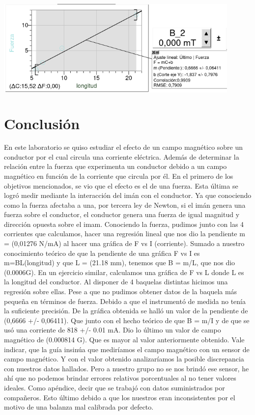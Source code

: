 \documentclass[12pt]{exam}
\newenvironment{Figura}
  {\par\medskip\noindent\minipage{\linewidth}}
  {\endminipage\par\medskip}
\begin{document}
\begin{multicols}{2}
\begin{Figura}
    \label{fig}
\end{Figura}
\begin{Figura}
    \centering
    \includegraphics[width=0.9\textwidth]{Img/Figura4_Lab12.png}
    \label{fig}
\end{Figura}
\section{Conclusión}
En este laboratorio se quiso estudiar el efecto de un campo magnético sobre un conductor por el cual circula una corriente eléctrica. Además de determinar la relación entre la fuerza que experimenta un conductor debido a un campo magnético en función de la corriente que circula por él. En el primero de los objetivos mencionados, se vio que el efecto es el de una fuerza. Esta última se logró medir mediante la interacción del imán con el conductor. Ya que conociendo como la fuerza afectaba a una, por tercera ley de Newton, si el imán genera una fuerza sobre el conductor, el conductor genera una fuerza de igual magnitud y dirección opuesta sobre el imam. Conociendo la fuerza, pudimos junto con las 4 corrientes que calculamos, hacer una regresión lineal que nos dio la pendiente m = (0,01276 N/mA) al hacer una gráfica de F vs I (corriente). Sumado a nuestro conocimiento teórico de que la pendiente de una gráfica F vs I es m=BL(longitud) y que L = (21.18 mm), tenemos que B = m/L, 	que nos dio (0.0006G).
En un ejercicio similar, calculamos una gráfica de F vs L donde L es la longitud del conductor. Al disponer de 4 baquelas distintas hicimos una regresión sobre ellas. Pese a que no pudimos obtener datos de la baquela más pequeña en términos de fuerza. Debido a que el instrumentó de medida no tenía la suficiente precisión. De la gráfica obtenida se halló un valor de la pendiente de (0,6666 +/- 0,06411). Que junto con el hecho teórico de que B = m/I y de que se usó una corriente de 818 +/- 0.01 mA. Dio lo último un valor de campo magnético de (0.000814 G). Que es mayor al valor anteriormente obtenido.
Vale indicar, que la guía insinúa que mediríamos el campo magnético con un sensor de campo magnético. Y con el valor obtenido analizaríamos la posible discrepancia con nuestros datos hallados. Pero a nuestro grupo no se nos brindó ese sensor, he ahí que no podemos brindar errores relativos porcentuales al no tener valores ideales.
Como apéndice, decir que se trabajó con datos suministrados por compañeros. Esto último debido a que los nuestros eran inconsistentes por el motivo de una balanza mal calibrada por defecto.  
\end{multicols}
\end{document}
